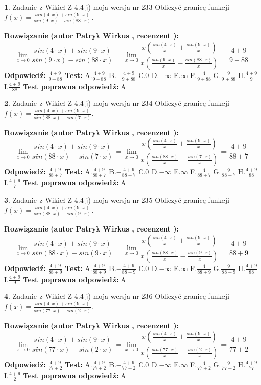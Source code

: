 \documentclass[12pt, a4paper]{article}
\theoremstyle{definition} %
\newtheorem{zad}{}
\newcommand{\zadStart}[1]{\begin{zad}#1\newline}
\newcommand{\zadStop}{\end{zad}}
\newcommand{\rozwStart}[2]{\noindent \textbf{Rozwiązanie (autor #1 , recenzent #2): }\newline}
\newcommand{\rozwStop}{\newline}
\newcommand{\odpStart}{\noindent \textbf{Odpowiedź:}\newline}
\newcommand{\odpStop}{\newline}
\newcommand{\testStart}{\noindent \textbf{Test:}\newline}
\newcommand{\testStop}{\newline}
\newcommand{\kluczStart}{\noindent \textbf{Test poprawna odpowiedź:}\newline}
\newcommand{\kluczStop}{\newline}
\begin{document}
\zadStart{Zadanie z Wikieł Z 4.4 j) moja wersja nr 233}
Obliczyć granicę funkcji $f(x)=\frac{sin(4\cdot x) +sin(9\cdot x)}{sin(9\cdot x) -sin(88\cdot x)}$.
\zadStop
\rozwStart{Patryk Wirkus}{}
$$\lim\limits_{x\to 0}\frac{sin(4\cdot x) +sin(9\cdot x)}{sin(9\cdot x) -sin(88\cdot x)}=\lim\limits_{x\to 0}\frac{x(\frac{sin(4\cdot x)}{x}+\frac{sin(9\cdot x)}{x})}{x(\frac{sin(9\cdot x)}{x}-\frac{sin(88\cdot x)}{x})}=\frac{4+9}{9+88}$$
\rozwStop
\odpStart
$\frac{4+9}{9+88}$
\odpStop
\testStart
A.$\frac{4+9}{9+88}$
B.$-\frac{4+9}{9+88}$
C.$0$
D.$-\infty$
E.$\infty$
F.$\frac{4}{9+88}$
G.$\frac{9}{9+88}$
H.$\frac{4+9}{9}$
I.$\frac{4+9}{88}$
\testStop
\kluczStart
A
\kluczStop



\zadStart{Zadanie z Wikieł Z 4.4 j) moja wersja nr 234}
Obliczyć granicę funkcji $f(x)=\frac{sin(4\cdot x) +sin(9\cdot x)}{sin(88\cdot x) -sin(7\cdot x)}$.
\zadStop
\rozwStart{Patryk Wirkus}{}
$$\lim\limits_{x\to 0}\frac{sin(4\cdot x) +sin(9\cdot x)}{sin(88\cdot x) -sin(7\cdot x)}=\lim\limits_{x\to 0}\frac{x(\frac{sin(4\cdot x)}{x}+\frac{sin(9\cdot x)}{x})}{x(\frac{sin(88\cdot x)}{x}-\frac{sin(7\cdot x)}{x})}=\frac{4+9}{88+7}$$
\rozwStop
\odpStart
$\frac{4+9}{88+7}$
\odpStop
\testStart
A.$\frac{4+9}{88+7}$
B.$-\frac{4+9}{88+7}$
C.$0$
D.$-\infty$
E.$\infty$
F.$\frac{4}{88+7}$
G.$\frac{9}{88+7}$
H.$\frac{4+9}{88}$
I.$\frac{4+9}{7}$
\testStop
\kluczStart
A
\kluczStop



\zadStart{Zadanie z Wikieł Z 4.4 j) moja wersja nr 235}
Obliczyć granicę funkcji $f(x)=\frac{sin(4\cdot x) +sin(9\cdot x)}{sin(88\cdot x) -sin(9\cdot x)}$.
\zadStop
\rozwStart{Patryk Wirkus}{}
$$\lim\limits_{x\to 0}\frac{sin(4\cdot x) +sin(9\cdot x)}{sin(88\cdot x) -sin(9\cdot x)}=\lim\limits_{x\to 0}\frac{x(\frac{sin(4\cdot x)}{x}+\frac{sin(9\cdot x)}{x})}{x(\frac{sin(88\cdot x)}{x}-\frac{sin(9\cdot x)}{x})}=\frac{4+9}{88+9}$$
\rozwStop
\odpStart
$\frac{4+9}{88+9}$
\odpStop
\testStart
A.$\frac{4+9}{88+9}$
B.$-\frac{4+9}{88+9}$
C.$0$
D.$-\infty$
E.$\infty$
F.$\frac{4}{88+9}$
G.$\frac{9}{88+9}$
H.$\frac{4+9}{88}$
I.$\frac{4+9}{9}$
\testStop
\kluczStart
A
\kluczStop



\zadStart{Zadanie z Wikieł Z 4.4 j) moja wersja nr 236}
Obliczyć granicę funkcji $f(x)=\frac{sin(4\cdot x) +sin(9\cdot x)}{sin(77\cdot x) -sin(2\cdot x)}$.
\zadStop
\rozwStart{Patryk Wirkus}{}
$$\lim\limits_{x\to 0}\frac{sin(4\cdot x) +sin(9\cdot x)}{sin(77\cdot x) -sin(2\cdot x)}=\lim\limits_{x\to 0}\frac{x(\frac{sin(4\cdot x)}{x}+\frac{sin(9\cdot x)}{x})}{x(\frac{sin(77\cdot x)}{x}-\frac{sin(2\cdot x)}{x})}=\frac{4+9}{77+2}$$
\rozwStop
\odpStart
$\frac{4+9}{77+2}$
\odpStop
\testStart
A.$\frac{4+9}{77+2}$
B.$-\frac{4+9}{77+2}$
C.$0$
D.$-\infty$
E.$\infty$
F.$\frac{4}{77+2}$
G.$\frac{9}{77+2}$
H.$\frac{4+9}{77}$
I.$\frac{4+9}{2}$
\testStop
\kluczStart
A
\kluczStop
\end{document}
